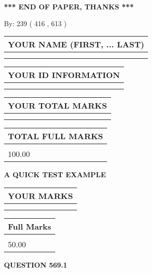 \documentclass[12pt]{article}
\begin{document}
\vspace{1.0in} 
{\textbf{\large{ *** END OF PAPER, THANKS *** }}} 
   
   
\hspace{1.0in} By: 
 239 ( 416 ,  613 )
   
   
   
   
\newpage 
\setcounter{page}{ 
   569001 } 
   
   
   
   
\noindent\begin{tabular}{|l|}
\hline
YOUR NAME (FIRST, ... LAST)  \\
\hline
 \\ 
 \\ 
\hline
\end{tabular}
\hspace{0.05in} \begin{tabular}{|l|}
\hline
 YOUR   ID   INFORMATION  \\
\hline
 \\ 
 \\ 
\hline
\end{tabular}
   
   
\vspace{0.2in}\noindent\begin{tabular}{|l|}
\hline
YOUR TOTAL MARKS  \\
\hline
 \\ 
 \\ 
\hline
\end{tabular}
\hspace{0.05in} \begin{tabular}{|l|}
\hline
TOTAL FULL MARKS  \\
\hline
 \\ 
100.00 \\
\hline
\end{tabular}
   
   
 \vspace{0.2in}
{\LARGE {\textbf{ A QUICK TEST EXAMPLE}}}
   
   
  
\vspace{0.2in}
  
\noindent\begin{tabular}{|l|}
\hline
 YOUR MARKS  \\
\hline
 \\ 
 \\ 
\hline
\end{tabular}
\hspace{0.05in} \begin{tabular}{|l|}
\hline
 Full Marks  \\
\hline
 \\ 
50.00 \\
\hline
\end{tabular}
{\textbf{\Large{QUESTION
569.1 
}}}
  
\end{document}
